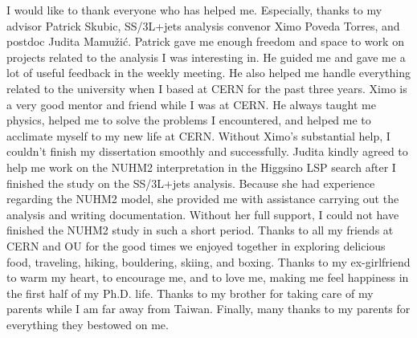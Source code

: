 I would like to thank everyone who has helped me.
%
Especially, thanks to my advisor Patrick Skubic, SS/3L+jets analysis convenor Ximo Poveda Torres, and postdoc Judita Mamu\v{z}i\'{c}.
%
Patrick gave me enough freedom and space to work on projects related to the analysis I was interesting in.
He guided me and gave me a lot of useful feedback in the weekly meeting.
He also helped me handle everything related to the university when I based at CERN for the past three years.
%
Ximo is a very good mentor and friend while I was at CERN.
He always taught me physics, helped me to solve the problems I encountered, and helped me to acclimate myself to my new life at CERN.
Without Ximo's substantial help, I couldn't finish my dissertation smoothly and successfully.
%
Judita kindly agreed to help me work on the NUHM2 interpretation in the Higgsino LSP search after I finished the study on the SS/3L+jets analysis.
Because she had experience regarding the NUHM2 model, she provided me with assistance carrying out the analysis and writing documentation.
Without her full support, I could not have finished the NUHM2 study in such a short period.
%
Thanks to all my friends at CERN and OU for the good times we enjoyed together in exploring delicious food, traveling, hiking, bouldering, skiing, and boxing.
Thanks to my ex-girlfriend to warm my heart, to encourage me, and to love me, making me feel happiness in the first half of my Ph.D. life.
Thanks to my brother for taking care of my parents while I am far away from Taiwan.
Finally, many thanks to my parents for everything they bestowed on me.



